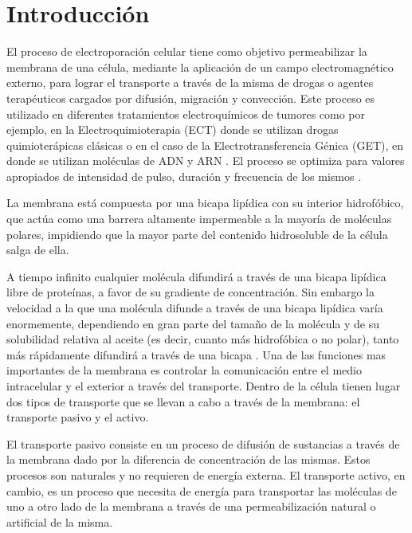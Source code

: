 \chapter{Introducción}

El proceso de electroporación celular tiene como objetivo permeabilizar la membrana de una célula, mediante la aplicación de un campo electromagnético externo, para lograr el transporte a través de la misma de drogas o agentes terapéuticos cargados por difusión, migración y convección. Este proceso es utilizado en diferentes tratamientos electroquímicos de tumores \cite{c1, c2} como por ejemplo, en la Electroquimioterapia (ECT) donde se utilizan drogas quimioterápicas clásicas o en el caso de la Electrotransferencia Génica (GET), en donde se utilizan moléculas de ADN y ARN \cite{c4-marino}. El proceso se optimiza para valores apropiados de intensidad de pulso, duración y frecuencia de los mismos \cite{c3, c4-marino}.

La membrana está compuesta por una bicapa lipídica con su interior hidrofóbico, que actúa como una barrera altamente impermeable a la mayoría de moléculas polares, impidiendo que la mayor parte del contenido hidrosoluble de la célula salga de ella. 

A tiempo infinito  cualquier molécula difundirá a través de una bicapa lipídica libre de proteínas, a favor de su gradiente de concentración. Sin embargo la velocidad a la que una molécula difunde a través de una bicapa lipídica varía enormemente, dependiendo en gran parte del tamaño de la molécula y de su solubilidad relativa al aceite (es decir, cuanto más hidrofóbica o no polar), tanto más rápidamente difundirá a través de una bicapa \cite[p.~470-471]{c12}. Una de las funciones mas importantes de la membrana es controlar la comunicación entre el medio intracelular y el exterior a través del transporte. Dentro de la célula tienen lugar dos tipos de transporte que se llevan a cabo a través de la membrana: el transporte pasivo y el activo. 

El transporte pasivo consiste en un proceso de difusión de sustancias a través de la membrana dado por la diferencia de concentración de las mismas. Estos procesos son naturales y no requieren de energía externa. El transporte activo, en cambio, es un proceso que necesita de energía para transportar las moléculas de uno a otro lado de la membrana a través de una permeabilización natural o artificial de la misma.

